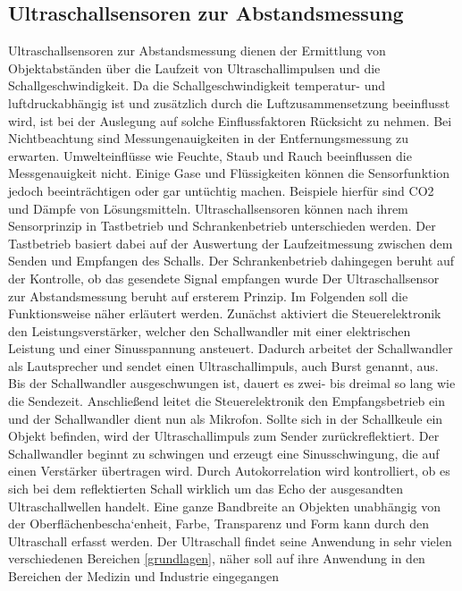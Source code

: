 \subsection{Ultraschallsensoren zur Abstandsmessung}
Ultraschallsensoren zur Abstandsmessung dienen der Ermittlung von Objektabständen
über die Laufzeit von Ultraschallimpulsen und die Schallgeschwindigkeit. Da die
Schallgeschwindigkeit temperatur- und luftdruckabhängig ist und zusätzlich durch die
Luftzusammensetzung beeinflusst wird, ist bei der Auslegung auf solche
Einflussfaktoren Rücksicht zu nehmen. Bei Nichtbeachtung sind Messungenauigkeiten
in der Entfernungsmessung zu erwarten. \cite{Hesse:2009} Umwelteinflüsse wie Feuchte, Staub und
Rauch beeinflussen die Messgenauigkeit nicht. Einige Gase und Flüssigkeiten können
die Sensorfunktion jedoch beeinträchtigen oder gar untüchtig machen. Beispiele hierfür
sind CO2 und Dämpfe von Lösungsmitteln. \cite{Hering:2012}
Ultraschallsensoren können nach ihrem Sensorprinzip in Tastbetrieb und
Schrankenbetrieb unterschieden werden. Der Tastbetrieb basiert dabei auf der
Auswertung der Laufzeitmessung zwischen dem Senden und Empfangen des Schalls.
Der Schrankenbetrieb dahingegen beruht auf der Kontrolle, ob das gesendete Signal
empfangen wurde \cite{Heinrich:2019} Der Ultraschallsensor zur Abstandsmessung beruht auf ersterem
Prinzip. Im Folgenden soll die Funktionsweise näher erläutert werden.
Zunächst aktiviert die Steuerelektronik den Leistungsverstärker, welcher den
Schallwandler mit einer elektrischen Leistung und einer Sinusspannung ansteuert.
Dadurch arbeitet der Schallwandler als Lautsprecher und sendet einen
Ultraschallimpuls, auch Burst genannt, aus. Bis der Schallwandler ausgeschwungen ist,
dauert es zwei- bis dreimal so lang wie die Sendezeit. Anschließend leitet die
Steuerelektronik den Empfangsbetrieb ein und der Schallwandler dient nun als
Mikrofon. Sollte sich in der Schallkeule ein Objekt befinden, wird der Ultraschallimpuls
zum Sender zurückreflektiert. Der Schallwandler beginnt zu schwingen und erzeugt eine
Sinusschwingung, die auf einen Verstärker übertragen wird. Durch Autokorrelation wird
kontrolliert, ob es sich bei dem reflektierten Schall wirklich um das Echo der
ausgesandten Ultraschallwellen handelt. \cite{Hesse:2009}
Eine ganze Bandbreite an Objekten unabhängig von der Oberflächenbescha`enheit,
Farbe, Transparenz \cite{Hering:2012} und Form \cite{Hesse:2009} kann durch den Ultraschall erfasst werden.
Der Ultraschall findet seine Anwendung in sehr vielen verschiedenen Bereichen \ref{grundlagen},
näher soll auf ihre Anwendung in den Bereichen der Medizin und Industrie eingegangen
